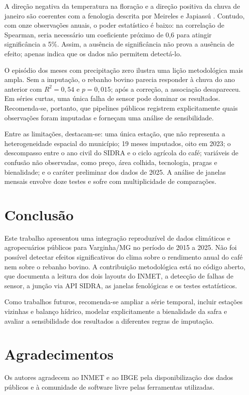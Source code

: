 \documentclass{RBCA}
\begin{document}
A dire\c{c}\~ao negativa da temperatura na flora\c{c}\~ao e a dire\c{c}\~ao positiva da chuva de janeiro s\~ao coerentes com a fenologia descrita por Meireles e Japiass\'u \cite{meireles2009}. Contudo, com onze observa\c{c}\~oes anuais, o poder estat\'istico \'e baixo: na correla\c{c}\~ao de Spearman, seria necess\'ario um coeficiente pr\'oximo de 0,6 para atingir signific\^ancia a 5\%. Assim, a aus\^encia de signific\^ancia n\~ao prova a aus\^encia de efeito; apenas indica que os dados n\~ao permitem detect\'a-lo.

O epis\'odio dos meses com precipita\c{c}\~ao zero ilustra uma li\c{c}\~ao metodol\'ogica mais ampla. Sem a imputa\c{c}\~ao, o rebanho bovino parecia responder \`a chuva do ano anterior com $R^2=0{,}54$ e $p=0{,}015$; ap\'os a corre\c{c}\~ao, a associa\c{c}\~ao desapareceu. Em s\'eries curtas, uma \'unica falha de sensor pode dominar os resultados. Recomenda-se, portanto, que pipelines p\'ublicos registrem explicitamente quais observa\c{c}\~oes foram imputadas e forne\c{c}am uma an\'alise de sensibilidade.

Entre as limita\c{c}\~oes, destacam-se: uma \'unica esta\c{c}\~ao, que n\~ao representa a heterogeneidade espacial do munic\'ipio; 19 meses imputados, oito em 2023; o descompasso entre o ano civil do SIDRA e o ciclo agr\'icola do caf\'e; vari\'aveis de confus\~ao n\~ao observadas, como pre\c{c}o, \'area colhida, tecnologia, pragas e bienalidade; e o car\'ater preliminar dos dados de 2025. A an\'alise de janelas mensais envolve doze testes e sofre com multiplicidade de compara\c{c}\~oes.

\section{Conclus\~ao}

Este trabalho apresentou uma integra\c{c}\~ao reproduz\'ivel de dados clim\'aticos e agropecu\'arios p\'ublicos para Varginha/MG no per\'iodo de 2015 a 2025. N\~ao foi poss\'ivel detectar efeitos significativos do clima sobre o rendimento anual do caf\'e nem sobre o rebanho bovino. A contribui\c{c}\~ao metodol\'ogica est\'a no c\'odigo aberto, que documenta a leitura dos dois layouts do INMET, a detec\c{c}\~ao de falhas de sensor, a jun\c{c}\~ao via API SIDRA, as janelas fenol\'ogicas e os testes estat\'isticos.

Como trabalhos futuros, recomenda-se ampliar a s\'erie temporal, incluir esta\c{c}\~oes vizinhas e balan\c{c}o h\'idrico, modelar explicitamente a bienalidade da safra e avaliar a sensibilidade dos resultados a diferentes regras de imputa\c{c}\~ao.

\section*{Agradecimentos}

Os autores agradecem ao INMET e ao IBGE pela disponibiliza\c{c}\~ao dos dados p\'ublicos e \`a comunidade de software livre pelas ferramentas utilizadas.

\makeatletter
\renewcommand\@biblabel[1]{{\parbox{0.8cm}{[#1]}}}
\makeatother


\end{document}
